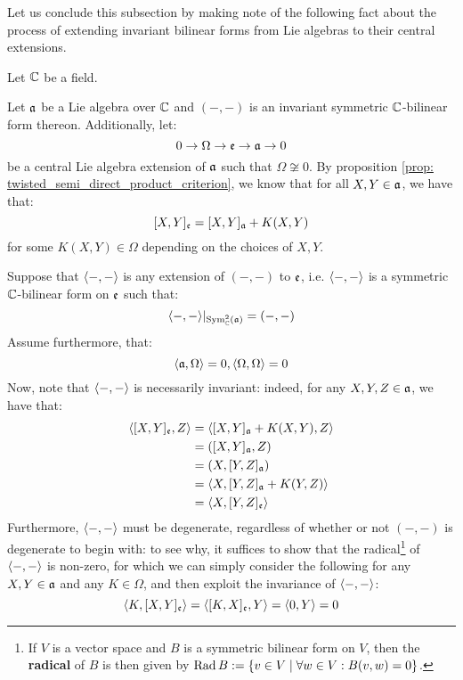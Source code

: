         Let us conclude this subsection by making note of the following fact about the process of extending invariant bilinear forms from Lie algebras to their central extensions.
        \begin{remark} \label{remark: extending_bilinear_forms_to_central_extensions}
            Let $\mathbb{C}$ be a field.
            
            Let $\mathfrak{a}$ be a Lie algebra over $\mathbb{C}$ and $(-, -)$ is an invariant symmetric $\mathbb{C}$-bilinear form thereon. Additionally, let:
                $$0 \to \Omega \to \mathfrak{e} \to \mathfrak{a} \to 0$$
            be a central Lie algebra extension of $\mathfrak{a}$ such that $\Omega \not \cong 0$. By proposition \ref{prop: twisted_semi_direct_product_criterion}, we know that for all $X, Y \in \mathfrak{a}$, we have that:
                $$[X, Y]_{\mathfrak{e}} = [X, Y]_{\mathfrak{a}} + K(X, Y)$$
            for some $K(X, Y) \in \Omega$ depending on the choices of $X, Y$.
            
            Suppose that $\langle-, -\rangle$ is any extension of $(-, -)$ to $\mathfrak{e}$, i.e. $\langle-, -\rangle$ is a symmetric $\mathbb{C}$-bilinear form on $\mathfrak{e}$ such that:
                $$\langle-, -\rangle|_{\mathrm{Sym}^2_{\mathbb{C}}( \mathfrak{a} )} = (-, -)$$
            Assume furthermore, that:
                $$\langle\mathfrak{a}, \Omega\rangle = 0, \langle\Omega, \Omega\rangle = 0$$ 
            Now, note that $\langle-, -\rangle$ is necessarily invariant: indeed, for any $X, Y, Z \in \mathfrak{a}$, we have that:
                $$
                    \begin{aligned}
                        \langle[X, Y]_{\mathfrak{e}}, Z\rangle & = \langle [X, Y]_{\mathfrak{a}} + K(X, Y), Z \rangle
                        \\
                        & = ([X, Y]_{\mathfrak{a}}, Z)
                        \\
                        & = (X, [Y, Z]_{\mathfrak{a}})
                        \\
                        & = \langle X, [Y, Z]_{\mathfrak{a}} + K(Y, Z) \rangle
                        \\
                        & = \langle X, [Y, Z]_{\mathfrak{e}} \rangle
                    \end{aligned}
                $$
            Furthermore, $\langle-, -\rangle$ must be degenerate, regardless of whether or not $(-, -)$ is degenerate to begin with: to see why, it suffices to show that the radical\footnote{If $V$ is a vector space and $B$ is a symmetric bilinear form on $V$, then the \textbf{radical} of $B$ is then given by $\operatorname{Rad} B := \{v \in V \mid \forall w \in V: B(v, w) = 0\}$.} of $\langle-, -\rangle$ is non-zero, for which we can simply consider the following for any $X, Y \in \mathfrak{a}$ and any $K \in \Omega$, and then exploit the invariance of $\langle-, -\rangle$:
                $$\langle K, [X, Y]_{\mathfrak{e}}\rangle = \langle[K, X]_{\mathfrak{e}}, Y\rangle = \langle0, Y\rangle = 0$$


\end{remark}
